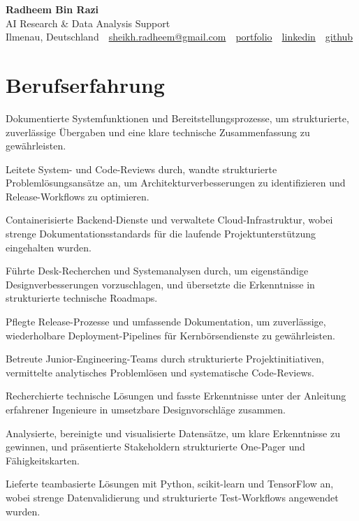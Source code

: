 \documentclass[11pt,a4paper]{resume}
\makeatletter
\newcommand{\Portfolio}{https://radheem.github.io/my-cv}
\newcommand{\PortfolioText}{portfolio}
\newcommand{\GitHub}{https://github.com/radheem}
\newcommand{\LinkedIn}{https://www.linkedin.com/in/radheem-razi}
\newcommand{\Email}{sheikh.radheem@gmail.com}
\makeatother
\begin{document}
\clearpage
{}

\begin{center}
  {\huge\bfseries Radheem Bin Razi}\\[3pt]
  {\large AI Research \& Data Analysis Support}\\[6pt]
  \small
  Ilmenau, Deutschland \,\textbar\,
  \href{mailto:\Email}{\Email} \,\textbar\,
  \href{\Portfolio}{\PortfolioText} \,\textbar\,
  \href{\LinkedIn}{linkedin} \,\textbar\,
  \href{\GitHub}{github}
\end{center}
\vspace{2pt}

\section{Berufserfahrung}

\bullets
  \item Dokumentierte Systemfunktionen und Bereitstellungsprozesse, um strukturierte, zuverlässige Übergaben und eine klare technische Zusammenfassung zu gewährleisten.
  \item Leitete System- und Code-Reviews durch, wandte strukturierte Problemlösungsansätze an, um Architekturverbesserungen zu identifizieren und Release-Workflows zu optimieren.
  \item Containerisierte Backend-Dienste und verwaltete Cloud-Infrastruktur, wobei strenge Dokumentationsstandards für die laufende Projektunterstützung eingehalten wurden.
\bulletsend
\vspace{3pt}
\bullets
  \item Führte Desk-Recherchen und Systemanalysen durch, um eigenständige Designverbesserungen vorzuschlagen, und übersetzte die Erkenntnisse in strukturierte technische Roadmaps.
  \item Pflegte Release-Prozesse und umfassende Dokumentation, um zuverlässige, wiederholbare Deployment-Pipelines für Kernbörsendienste zu gewährleisten.
  \item Betreute Junior-Engineering-Teams durch strukturierte Projektinitiativen, vermittelte analytisches Problemlösen und systematische Code-Reviews.
\bulletsend
\vspace{3pt}
\bullets
  \item Recherchierte technische Lösungen und fasste Erkenntnisse unter der Anleitung erfahrener Ingenieure in umsetzbare Designvorschläge zusammen.
  \item Analysierte, bereinigte und visualisierte Datensätze, um klare Erkenntnisse zu gewinnen, und präsentierte Stakeholdern strukturierte One-Pager und Fähigkeitskarten.
  \item Lieferte teambasierte Lösungen mit Python, scikit-learn und TensorFlow an, wobei strenge Datenvalidierung und strukturierte Test-Workflows angewendet wurden.
\bulletsend
\vspace{3pt}
\end{document}
